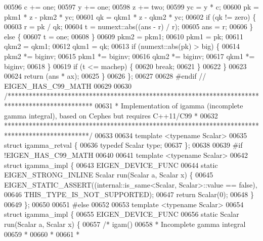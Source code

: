 \begin{DoxyCode}
00596       c += one;
00597       y += one;
00598       z += two;
00599       yc = y * c;
00600       pk = pkm1 * z - pkm2 * yc;
00601       qk = qkm1 * z - qkm2 * yc;
00602       \textcolor{keywordflow}{if} (qk != zero) \{
00603         r = pk / qk;
00604         t = numext::abs((ans - r) / r);
00605         ans = r;
00606       \} \textcolor{keywordflow}{else} \{
00607         t = one;
00608       \}
00609       pkm2 = pkm1;
00610       pkm1 = pk;
00611       qkm2 = qkm1;
00612       qkm1 = qk;
00613       \textcolor{keywordflow}{if} (numext::abs(pk) > big) \{
00614         pkm2 *= biginv;
00615         pkm1 *= biginv;
00616         qkm2 *= biginv;
00617         qkm1 *= biginv;
00618       \}
00619       \textcolor{keywordflow}{if} (t <= machep) \{
00620         \textcolor{keywordflow}{break};
00621       \}
00622     \}
00623 
00624     \textcolor{keywordflow}{return} (ans * ax);
00625   \}
00626 \};
00627 
00628 \textcolor{preprocessor}{#endif  // EIGEN\_HAS\_C99\_MATH}
00629 
00630 \textcolor{comment}{/************************************************************************************************}
00631 \textcolor{comment}{ * Implementation of igamma (incomplete gamma integral), based on Cephes but requires C++11/C99 *}
00632 \textcolor{comment}{ ************************************************************************************************/}
00633 
00634 \textcolor{keyword}{template} <\textcolor{keyword}{typename} Scalar>
00635 \textcolor{keyword}{struct }igamma\_retval \{
00636   \textcolor{keyword}{typedef} Scalar type;
00637 \};
00638 
00639 \textcolor{preprocessor}{#if !EIGEN\_HAS\_C99\_MATH}
00640 
00641 \textcolor{keyword}{template} <\textcolor{keyword}{typename} Scalar>
00642 \textcolor{keyword}{struct }igamma\_impl \{
00643   EIGEN\_DEVICE\_FUNC
00644   \textcolor{keyword}{static} EIGEN\_STRONG\_INLINE Scalar run(Scalar a, Scalar x) \{
00645     EIGEN\_STATIC\_ASSERT((internal::is\_same<Scalar, Scalar>::value == \textcolor{keyword}{false}),
00646                         THIS\_TYPE\_IS\_NOT\_SUPPORTED);
00647     \textcolor{keywordflow}{return} Scalar(0);
00648   \}
00649 \};
00650 
00651 \textcolor{preprocessor}{#else}
00652 
00653 \textcolor{keyword}{template} <\textcolor{keyword}{typename} Scalar>
00654 \textcolor{keyword}{struct }igamma\_impl \{
00655   EIGEN\_DEVICE\_FUNC
00656   \textcolor{keyword}{static} Scalar run(Scalar a, Scalar x) \{
00657     \textcolor{comment}{/*  igam()}
00658 \textcolor{comment}{     *  Incomplete gamma integral}
00659 \textcolor{comment}{     *}
00660 \textcolor{comment}{     *}
00661 \textcolor{comment}{     *}

\end{DoxyCode}
